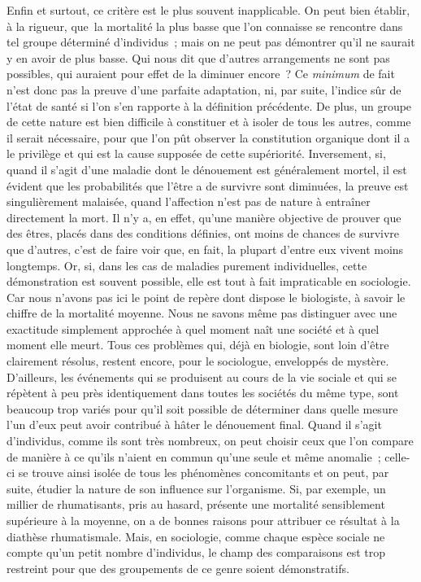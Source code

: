 \documentclass[french,twoside]{book} %
\begin{document}
Enfin et surtout, ce critère est le plus souvent inapplicable. On peut bien établir, à la rigueur, que la mortalité la plus basse que l’on connaisse se rencontre dans tel groupe déterminé d’individus ; mais on ne peut pas démontrer qu’il ne saurait y en avoir de plus basse. Qui nous dit que d’autres arrangements ne sont pas possibles, qui auraient pour effet de la diminuer encore ? Ce {\itshape minimum} de fait n’est donc pas la preuve d’une parfaite adaptation, ni, par suite, l’indice sûr de l’état de santé si l’on s’en rapporte à la définition précédente. De plus, un groupe de cette nature est bien difficile à constituer et à isoler de tous les autres, comme il serait nécessaire, pour que l’on pût observer la constitution organique dont il a le privilège et qui est la cause supposée de cette supériorité. Inversement, si, quand il s’agit d’une maladie dont le dénouement est généralement mortel, il est évident que les probabilités que l’être a de survivre sont diminuées, la preuve est singulièrement malaisée, quand l’affection n’est pas de nature à entraîner directement la mort. Il n’y a, en effet, qu’une manière objective de prouver que des êtres, placés dans des conditions définies, ont moins de chances de survivre que d’autres, c’est de faire voir que, en fait, la plupart d’entre eux vivent moins longtemps. Or, si, dans les cas de maladies purement individuelles, cette démonstration est souvent possible, elle est tout à fait impraticable en sociologie. Car nous n’avons pas ici le point de repère dont dispose le biologiste, à savoir le chiffre de la mortalité moyenne. Nous ne savons même pas distinguer avec une exactitude simplement approchée à quel moment naît une société et à quel moment elle meurt. Tous ces problèmes qui, déjà en biologie, sont loin d’être clairement résolus, restent encore, pour le sociologue, enveloppés de mystère. D’ailleurs, les événements qui se produisent au cours de la vie sociale et qui se répètent à peu près identiquement dans toutes les sociétés du même type, sont beaucoup trop variés pour qu’il soit possible de déterminer dans quelle mesure l’un d’eux peut avoir contribué à hâter le dénouement final. Quand il s’agit d’individus, comme ils sont très nombreux, on peut choisir ceux que l’on compare de manière à ce qu’ils n’aient en commun qu’une seule et même anomalie ; celle-ci se trouve ainsi isolée de tous les phénomènes concomitants et on peut, par suite, étudier la nature de son influence sur l’organisme. Si, par exemple, un millier de rhumatisants, pris au hasard, présente une mortalité sensiblement supérieure à la moyenne, on a de bonnes raisons pour attribuer ce résultat à la diathèse rhumatismale. Mais, en sociologie, comme chaque espèce sociale ne compte qu’un petit nombre d’individus, le champ des comparaisons est trop restreint pour que des groupements de ce genre soient démonstratifs.\par
\end{document}
